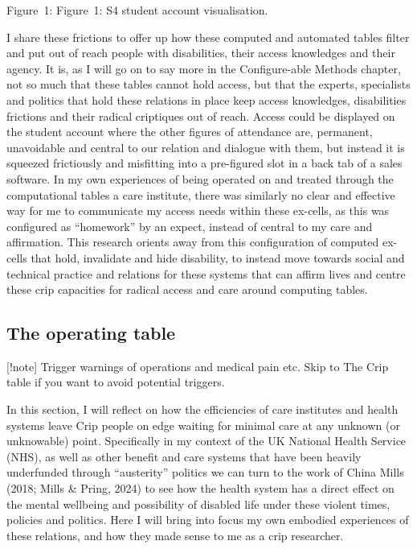Figure~1: Figure~1: S4 student account visualisation.

I share these frictions to offer up how these computed and automated
tables filter and put out of reach people with disabilities, their
access knowledges and their agency. It is, as I will go on to say more
in the Configure-able Methods chapter, not so much that these tables
cannot hold access, but that the experts, specialists and politics that
hold these relations in place keep access knowledges, disabilities
frictions and their radical criptiques out of reach. Access could be
displayed on the student account where the other figures of attendance
are, permanent, unavoidable and central to our relation and dialogue
with them, but instead it is squeezed frictiously and misfitting into a
pre-figured slot in a back tab of a sales software. In my own
experiences of being operated on and treated through the computational
tables a care institute, there was similarly no clear and effective way
for me to communicate my access needs within these ex-cells, as this was
configured as ``homework'' by an expect, instead of central to my care
and affirmation. This research orients away from this configuration of
computed ex-cells that hold, invalidate and hide disability, to instead
move towards social and technical practice and relations for these
systems that can affirm lives and centre these crip capacities for
radical access and care around computing tables.

\hypertarget{the-operating-table}{%
\subsection[The operating
table]{\texorpdfstring{\protect\hypertarget{anchor}{}{}The operating
table}{The operating table}}\label{the-operating-table}}

{[}!note{]} Trigger warnings of operations and medical pain etc. Skip to
The Crip table if you want to avoid potential triggers.

In this section, I will reflect on how the efficiencies of care
institutes and health systems leave Crip people on edge waiting for
minimal care at any unknown (or unknowable) point. Specifically in my
context of the UK National Health Service (NHS), as well as other
benefit and care systems that have been heavily underfunded through
``austerity'' politics we can turn to the work of China Mills (2018;
Mills \& Pring, 2024) to see how the health system has a direct effect
on the mental wellbeing and possibility of disabled life under these
violent times, policies and politics. Here I will bring into focus my
own embodied experiences of these relations, and how they made sense to
me as a crip researcher.

